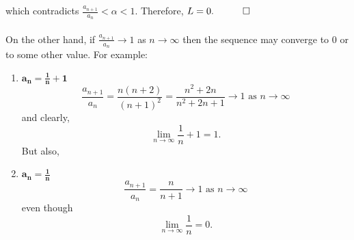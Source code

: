 \documentclass[../MathsNotesBase.tex]{subfiles}
\begin{document}
{\begin{exe}
{				which contradicts ${ \frac{a_{n+1}}{a_n} < \alpha < 1 }$. Therefore, ${ L = 0.  \hspace{10pt}\qed}$\\\\
				On the other hand, if ${ \frac{a_{n+1}}{a_n} \to 1 }$ as ${ n \to \infty }$ then the sequence may converge to 0 or to some other value. For example:
				\begin{enumerate}[label=(\roman*)]
					\item{${\bm{ a_n = \frac{1}{n} + 1 }}$}
					\[ \frac{a_{n+1}}{a_n} = \frac{n(n+2)}{(n+1)^2} =\frac{n^2 + 2n}{n^2 + 2n + 1} \to 1 \text{ as } n \to \infty \]
					and clearly,
					\[ \lim_{n \to \infty} \frac{1}{n} + 1 = 1. \]
					But also,
					\item{${\bm{ a_n = \frac{1}{n} }}$}
					\[  \frac{a_{n+1}}{a_n} = \frac{n}{n+1} \to 1 \text{ as } n \to \infty \]
					even though
					\[ \lim_{n \to \infty} \frac{1}{n} = 0. \]
				\end{enumerate}
		}
		\end{exe}
	}
	
\end{document}
